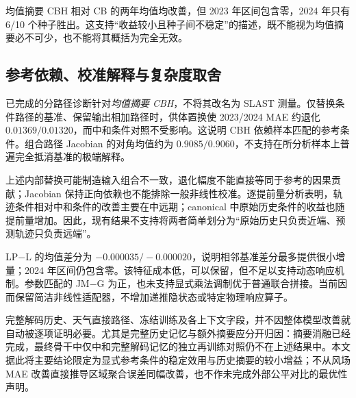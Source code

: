 均值摘要 CBH 相对 CB 的两年均值均改善，但 2023 年区间包含零，2024 年只有 6/10 个种子胜出。这支持“收益较小且种子间不稳定”的描述，既不能视为均值摘要必不可少，也不能将其概括为完全无效。

\subsection{参考依赖、校准解释与复杂度取舍}

已完成的分路径诊断针对\emph{均值摘要 CBH}，不将其改名为 SLAST 测量。仅替换条件路径的基准、保留输出相加路径时，供体置换使 2023/2024 MAE 约退化 $0.01369/0.01320$，而中和条件对照不受影响。这说明 CBH 依赖样本匹配的参考条件。组合路径 Jacobian 的对角均值约为 $0.9085/0.9060$，不支持在所分析样本上普遍完全抵消基准的极端解释。

上述内部替换可能制造输入组合不一致，退化幅度不能直接等同于参考的因果贡献；Jacobian 保持正向依赖也不能排除一般非线性校准。逐提前量分析表明，轨迹条件相对中和条件的改善主要在中远期；canonical 中原始历史条件的收益也随提前量增加。因此，现有结果不支持将两者简单划分为“原始历史只负责近端、预测轨迹只负责远端”。

LP$-$L 的均值差分为 $-0.000035/-0.000020$，说明相邻基准差分最多提供很小增量；2024 年区间仍包含零。该特征成本低，可以保留，但不足以支持动态响应机制。参数匹配的 JM$-$G 为正，也未支持显式乘法调制优于普通联合拼接。当前因而保留简洁非线性适配器，不增加递推隐状态或特定物理响应算子。

完整解码历史、天气直接路径、冻结训练及各上下文字段，并不因整体模型改善就自动被逐项证明必要。尤其是完整历史记忆与额外摘要应分开归因：摘要消融已经完成，最终骨干中仅中和完整解码记忆的独立再训练对照仍不在上述结果中。本文据此将主要结论限定为显式参考条件的稳定效用与历史摘要的较小增益；不从风场 MAE 改善直接推导区域聚合误差同幅改善，也不作未完成外部公平对比的最优性声明。
